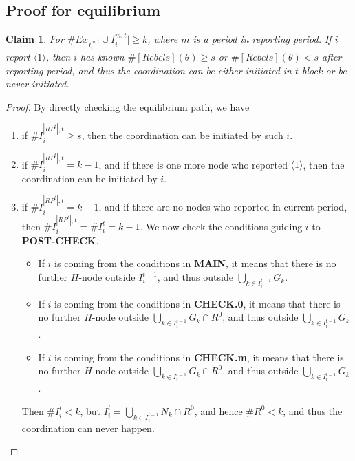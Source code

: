 \documentclass[12pt]{article}
\newtheorem{claim}{Claim}[subsubsection]
\theoremstyle{remark}
\theoremstyle{remark}
\begin{document}







\subsection{Proof for equilibrium}

\begin{claim}
\label{claim_either_success_or_fail}
For $\#Ex_{I^{m,t}_i}\cup I^{m,t}_i|\geq k$, where $m$ is a period in reporting period. If $i$ report $\langle 1 \rangle$, then $i$ has known $\#[Rebels](\theta)\geq s$ or $\#[Rebels](\theta)<s$ after reporting period, and thus the coordination can be either initiated in $t$-block or be never initiated.
\end{claim}
\begin{proof}
By directly checking the equilibrium path, we have
\begin{enumerate}


\item if $\# I^{|RP^t|,t}_i\geq s$, then the coordination can be initiated by such $i$.
\item if $\# I^{|RP^t|,t}_i= k-1$, and if there is one more node who reported $\langle 1 \rangle$, then the coordination can be initiated by $i$.
\item if $\# I^{|RP^t|,t}_i= k-1$, and if there are no nodes who reported in current period, then $\# I^{|RP^t|,t}_i=\# I^{t}_i= k-1$. We now check the conditions guiding $i$ to \textbf{POST-CHECK}.
\begin{itemize}
\item If $i$ is coming from the conditions in \textbf{MAIN}, it means that there is no further $H$-node outside $I^{t-1}_i$, and thus outside $\bigcup_{k\in I^{t-1}_i}G_k$.
\item If $i$ is coming from the conditions in \textbf{CHECK.0}, it means that there is no further $H$-node outside $\bigcup_{k\in I^{t-1}_i}G_k\cap R^0$, and thus outside $\bigcup_{k\in I^{t-1}_i}G_k$. 
\item If $i$ is coming from the conditions in \textbf{CHECK.m}, it means that there is no further $H$-node outside $\bigcup_{k\in I^{t-1}_i}G_k\cap R^0$, and thus outside $\bigcup_{k\in I^{t-1}_i}G_k$. 
\end{itemize}
Then $\# I^{t}_i< k$, but $I^t_i=\bigcup_{k\in I^{t-1}_i}N_k\cap R^0$, and hence $\# R^0<k$, and thus the coordination can never happen.

\end{enumerate}


\end{proof}
\end{document}
